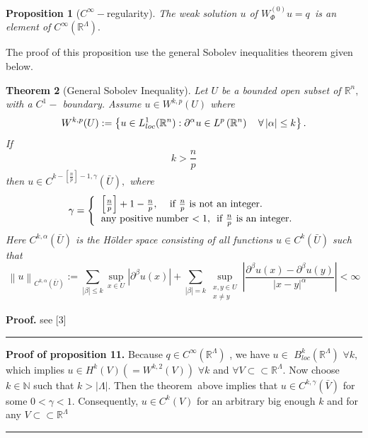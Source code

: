 \documentclass{article}
\newtheorem{theorem}{Theorem}
\newtheorem{proposition}[theorem]{Proposition}
\newenvironment{proof}[1][Proof]{\noindent\textbf{#1.} }{\ \rule{0.5em}{0.5em}}
\begin{document}
\begin{proposition}[$C^{\infty }-$regularity]
\textit{The weak solution }$u$ \textit{of }$W_{\Phi }^{(0)}u=q$\textit{\ is
an element of }$C^{\infty }(\mathbb{R}^{\Lambda }).$
\end{proposition}

The proof of this proposition use the general Sobolev inequalities theorem
given below.

\begin{theorem}[General Sobolev Inequality]
Let $U$ be a bounded open subset of $\mathbb{R}^{n},$ with a $C^{1}-$%
boundary. Assume $u\in W^{k,p}(U)$ where 
\begin{equation*}
W^{k,p}(U):=\left\{ u\in L_{loc}^{1}(\mathbb{R}^{n}):\partial ^{\alpha }u\in
L^{p}\left( \mathbb{R}^{n}\right) \mathbb{\ \ \ \forall }\left| \mathbb{%
\alpha }\right| \leq k\right\} .
\end{equation*}%
If 
\begin{equation*}
k>\frac{n}{p}
\end{equation*}%
then $u\in C^{k-\left[ \frac{n}{p}\right] -1,\gamma }(\bar{U}),$ where 
\begin{equation*}
\gamma =\left\{ 
\begin{tabular}{l}
$\left[ \frac{n}{p}\right] +1-\frac{n}{p},\ \ \ \ $if $\frac{n}{p}$ is not
an integer. \\ 
any positive number $<1,$ \ if $\frac{n}{p}$ is an integer.%
\end{tabular}%
\right.
\end{equation*}%
Here $C^{k,\alpha }(\bar{U})$ is the H\"{o}lder space consisting of all
functions $u\in C^{k}(\bar{U})$ such that 
\begin{equation*}
\left\| u\right\| _{C^{k,\alpha }(\bar{U})}:=\sum_{\left| \beta \right| \leq
k}\sup_{x\in U}\left| \partial ^{\beta }u(x)\right| +\sum_{\left| \beta
\right| =k}\sup_{\substack{ x,y\in U  \\ x\neq y}}\left| \frac{\partial
^{\beta }u(x)-\partial ^{\beta }u(y)}{\left| x-y\right| ^{\alpha }}\right|
<\infty
\end{equation*}
\end{theorem}

\begin{proof}
see [3]
\end{proof}

\begin{proof}[Proof of proposition 11]
Because $q\in C^{\infty }(\mathbb{R}^{\Lambda })$ , we have $u\in $ $%
B_{loc}^{k}(\mathbb{R}^{\Lambda })$ $\forall k,$ which implies $u\in
H^{k}(V)\left( =W^{k,2}(V)\right) $ $\forall k$ and $\forall V\subset
\subset \mathbb{R}^{\Lambda }.$ Now choose $k\in \mathbb{N}$ such that $%
k>\left\vert \Lambda \right\vert .$ Then the theorem $\ $above implies that $%
u\in C^{k,\gamma }(\bar{V})$ for some $0<\gamma <1$. Consequently, $u\in
C^{k}(V)$ for an arbitrary big enough $k$ and for any $V\subset \subset 
\mathbb{R}^{\Lambda }$
\end{proof}
\end{document}
